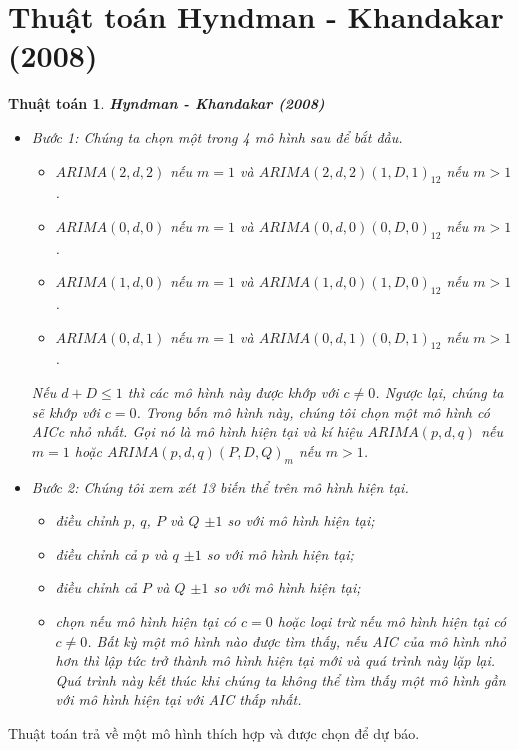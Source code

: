 \documentclass[12pt, a4paper,oneside]{book}
\newtheorem{algo}[theo]{\bf Thuật toán}
\theoremstyle{definition}
\begin{document}
\section{Thuật toán Hyndman - Khandakar (2008)}
\begin{algo}\cite{10}\label{H} \textbf{Hyndman - Khandakar (2008)}\\
	\begin{itemize}
		\item Bước 1: Chúng ta chọn một trong 4 mô hình sau để bắt đầu.
		\begin{itemize}
			\item $ARIMA(2,d,2)$ nếu $m=1$ và $ARIMA(2,d,2)(1,D,1)_{12}$ nếu $m >1$.
			\item $ARIMA(0,d,0)$ nếu $m = 1$ và $ARIMA(0,d,0)(0,D,0)_{12}$ nếu $m >1$.
			\item $ARIMA(1,d,0)$ nếu $m = 1$ và $ARIMA(1,d,0)(1,D,0)_{12}$ nếu $m >1$.
			\item $ARIMA(0,d,1)$ nếu $m = 1$ và $ARIMA(0,d,1)(0,D,1)_{12}$ nếu $m >1$.
		\end{itemize}
		Nếu $d+D\leq1$ thì các mô hình này được khớp với $c\neq0$. Ngược lại, chúng ta sẽ khớp với $c=0$. Trong bốn mô hình này, chúng tôi chọn một mô hình có AICc nhỏ nhất. Gọi nó là mô hình hiện tại và kí hiệu $ARIMA(p,d,q)$ nếu $m=1$ hoặc $ARIMA(p,d,q)(P,D,Q)_m$ nếu $m>1$.\\
		\item Bước 2: Chúng tôi xem xét 13 biến thể trên mô hình hiện tại.
		\begin{itemize}
			\item điều chỉnh $p$, $q$, $P$ và $Q$ $\pm1$ so với mô hình hiện tại;
			\item điều chỉnh cả $p$ và $q$ $\pm1$ so với mô hình hiện tại;
			\item điều chỉnh cả $P$ và $Q$ $\pm1$ so với mô hình hiện tại;
			\item chọn nếu mô hình hiện tại có $c = 0$ hoặc loại trừ nếu mô hình hiện tại có $c\neq0$.
			Bất kỳ một mô hình nào được tìm thấy, nếu AIC của mô hình nhỏ hơn thì lập tức trở thành mô hình hiện tại mới và quá trình này lặp lại. Quá trình này kết thúc khi chúng ta không thể tìm thấy một mô hình gần với mô hình hiện tại với AIC thấp nhất. 
		\end{itemize}
	\end{itemize}
\end{algo}
Thuật toán trả về một mô hình thích hợp và được chọn để dự báo.
\end{document}

